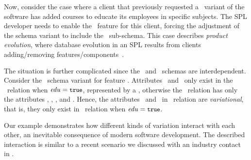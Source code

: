 Now, consider the case where a client that previously requested a \basic\ variant of the
software has added courses to educate its
employees in specific subjects. The SPL developer needs to enable
the \edu\ feature for this client, forcing the adjustment of the schema variant
to include the \educational\ sub-schema.
This case describes \emph{product evolution}, where
database evolution in an SPL results
from clients adding/removing features/components~\cite{dbSPLevolve}. 

The situation is further complicated since the \basic\ and \educational\
schemas are interdependent.
Consider
the \basic\ schema 
variant for feature \vFour. Attributes \isstudent\ and \isteacher\ only exist
in the \empacct\ relation when $\edu=\t$, represented by a ,
otherwise the \empacct\
relation has only the attributes \empno, \hiredate, \titleatt, and \deptno.
Hence, the attributes \isstudent\ and \isteacher\ in \empacct\ relation are
\emph{variational}, that is, they only exist in \empacct\ relation
when $\edu=\t$.


Our example demonstrates how different kinds of variation
interact with each other, an inevitable consequence of modern software
development.
The described interaction is similar to a recent scenario we discussed with an
industry contact in .
